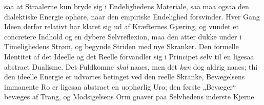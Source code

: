 \documentclass[12pt]{book}
\newcommand{\opage}[1]{\marginnote{\footnotesize\textit{[#1]}}}
\begin{document}
saa at Straalerne kun bryde sig i Endelighedens Materiale, saa maa ogsaa den dialektiske
Energie ophøre, naar den empiriske Endelighed forsvinder. Hver Gang Ideen derfor relativt
har klaret sig ud af Kræfternes Gjæring, og vundet et concretere Indhold
\opage{202} %
og en dybere Selvreflexion, maa den atter dukke under i Timelighedens Strøm, og begynde
Striden med nye Skranker. Den formelle Identitet af det Ideelle og det Reelle forvandler
sig i Principet selv til en ligesaa abstract Dualisme. Det Fuldkomne \emph{skal} naaes,
men det \emph{kan} dog aldrig naaes; thi den ideelle Energie er udvortes betinget ved den
reelle Skranke, Bevægelsens immanente Ro er ligesaa abstract en uophørlig Uro; den første
„Bevæger“ bevæges af Trang, og Modsigelsens Orm gnaver paa Selvhedens inderste Kjerne.
\end{document}
